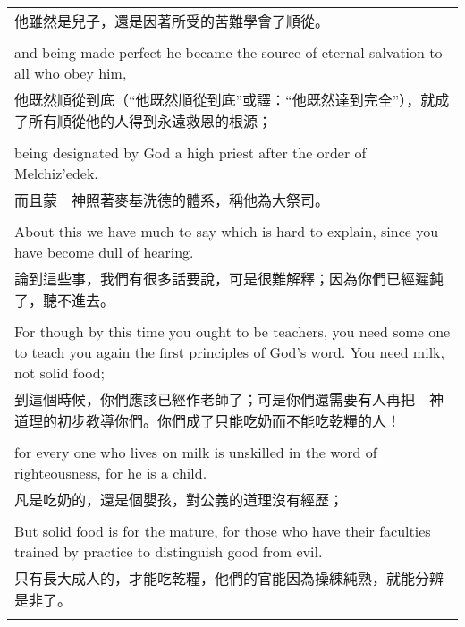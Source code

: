 \documentclass{book}
\begin{document}
\begin{tabularx}{\textwidth}{p{}}
他雖然是兒子，還是因著所受的苦難學會了順從。 \\ \\
and being made perfect he became the source of eternal salvation to all who obey him, \\
他既然順從到底（“他既然順從到底”或譯：“他既然達到完全”），就成了所有順從他的人得到永遠救恩的根源； \\ \\
being designated by God a high priest after the order of Melchiz'edek. \\
而且蒙　神照著麥基洗德的體系，稱他為大祭司。 \\ \\
About this we have much to say which is hard to explain, since you have become dull of hearing. \\
論到這些事，我們有很多話要說，可是很難解釋；因為你們已經遲鈍了，聽不進去。 \\ \\
For though by this time you ought to be teachers, you need some one to teach you again the first principles of God's word. You need milk, not solid food; \\
到這個時候，你們應該已經作老師了；可是你們還需要有人再把　神道理的初步教導你們。你們成了只能吃奶而不能吃乾糧的人！ \\ \\
for every one who lives on milk is unskilled in the word of righteousness, for he is a child. \\
凡是吃奶的，還是個嬰孩，對公義的道理沒有經歷； \\ \\
But solid food is for the mature, for those who have their faculties trained by practice to distinguish good from evil. \\
只有長大成人的，才能吃乾糧，他們的官能因為操練純熟，就能分辨是非了。 \\ \\

\hline
\end{tabularx}

\newpage
\end{document}
